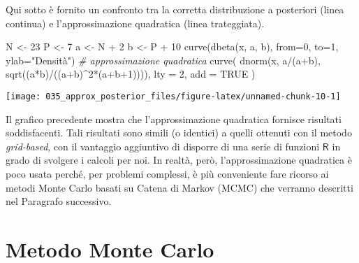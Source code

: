 \documentclass[
]{memoir}
\newenvironment{Shaded}{\begin{snugshade}}{\end{snugshade}}
\newcommand{\AttributeTok}[1]{\textcolor[rgb]{0.77,0.63,0.00}{#1}}
\newcommand{\CommentTok}[1]{\textcolor[rgb]{0.56,0.35,0.01}{\textit{#1}}}
\newcommand{\ConstantTok}[1]{\textcolor[rgb]{0.00,0.00,0.00}{#1}}
\newcommand{\DecValTok}[1]{\textcolor[rgb]{0.00,0.00,0.81}{#1}}
\newcommand{\FunctionTok}[1]{\textcolor[rgb]{0.00,0.00,0.00}{#1}}
\newcommand{\NormalTok}[1]{#1}
\newcommand{\OtherTok}[1]{\textcolor[rgb]{0.56,0.35,0.01}{#1}}
\newcommand{\SpecialCharTok}[1]{\textcolor[rgb]{0.00,0.00,0.00}{#1}}
\newcommand{\StringTok}[1]{\textcolor[rgb]{0.31,0.60,0.02}{#1}}
\newcommand{\R}{\textsf{R}} %
\begin{document}
Qui sotto è fornito un confronto tra la corretta distribuzione a posteriori (linea continua) e l'approssimazione quadratica (linea trateggiata).

\begin{Shaded}
\begin{Highlighting}[]
\NormalTok{N }\OtherTok{\textless{}{-}} \DecValTok{23}
\NormalTok{P }\OtherTok{\textless{}{-}} \DecValTok{7}
\NormalTok{a }\OtherTok{\textless{}{-}}\NormalTok{ N }\SpecialCharTok{+} \DecValTok{2}
\NormalTok{b }\OtherTok{\textless{}{-}}\NormalTok{ P }\SpecialCharTok{+} \DecValTok{10}
\FunctionTok{curve}\NormalTok{(}\FunctionTok{dbeta}\NormalTok{(x, a, b), }\AttributeTok{from=}\DecValTok{0}\NormalTok{, }\AttributeTok{to=}\DecValTok{1}\NormalTok{, }\AttributeTok{ylab=}\StringTok{"Densità"}\NormalTok{)}
\CommentTok{\# approssimazione quadratica}
\FunctionTok{curve}\NormalTok{(}
  \FunctionTok{dnorm}\NormalTok{(x, a}\SpecialCharTok{/}\NormalTok{(a}\SpecialCharTok{+}\NormalTok{b), }\FunctionTok{sqrt}\NormalTok{((a}\SpecialCharTok{*}\NormalTok{b)}\SpecialCharTok{/}\NormalTok{((a}\SpecialCharTok{+}\NormalTok{b)}\SpecialCharTok{\^{}}\DecValTok{2}\SpecialCharTok{*}\NormalTok{(a}\SpecialCharTok{+}\NormalTok{b}\SpecialCharTok{+}\DecValTok{1}\NormalTok{)))),}
  \AttributeTok{lty =} \DecValTok{2}\NormalTok{,}
  \AttributeTok{add =} \ConstantTok{TRUE}
\NormalTok{)}
\end{Highlighting}
\end{Shaded}

\begin{center}\texttt{[image: 035\_approx\_posterior\_files/figure-latex/unnamed-chunk-10-1]} \end{center}

Il grafico precedente mostra che l'approssimazione quadratica fornisce risultati soddisfacenti. Tali risultati sono simili (o identici) a quelli ottenuti con il metodo \emph{grid-based}, con il vantaggio aggiuntivo di disporre di una serie di funzioni \(\R\) in grado di svolgere i calcoli per noi. In realtà, però, l'approssimazione quadratica è poco usata perché, per problemi complessi, è più conveniente fare ricorso ai metodi Monte Carlo basati su Catena di Markov (MCMC) che verranno descritti nel Paragrafo successivo.

\hypertarget{chapter-simulazioneMC}{%
\section{Metodo Monte Carlo}\label{chapter-simulazioneMC}}
\end{document}
